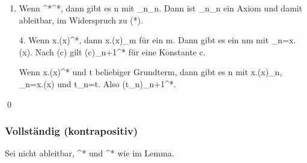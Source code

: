 \begin{enumerate}
  \item Wenn \varphi\in\Gamma^*\cap\Delta^*, dann gibt es n mit \varphi\in\Gamma_n\cap\Delta_n. Dann ist \Gamma_n\IMPL\Delta_n ein Axiom und damit ableitbar, im Widerspruch zu (*).
  
  \item[4.] Wenn \exists x.\varphi(x)\in\Gamma^*, dann \exists x.\psi(x)\in\Gamma_m für ein m. Dann gibt es ein n\geq m mit \varphi_n=\exists x.\psi(x). Nach (c) gilt \psi(c)\in\Gamma_{n+1}\subseteq\Gamma^* für eine Konstante c.
  
  Wenn \exists x.\psi(x)\in\Delta^* und t beliebiger Grundterm, dann gibt es n mit \exists x.\psi(x)\in\Delta_n, \varphi_n=\exists x.\psi(x) und t_n=t. Also \psi(t_n)\in\Delta_{n+1}\in\subseteq\Delta^*.
\end{enumerate}
\qed

\subsubsection{Vollständig (kontrapositiv)}

Sei \Gamma\IMPL\Delta nicht ableitbar, \Gamma^* und \Delta^* wie im Lemma.
